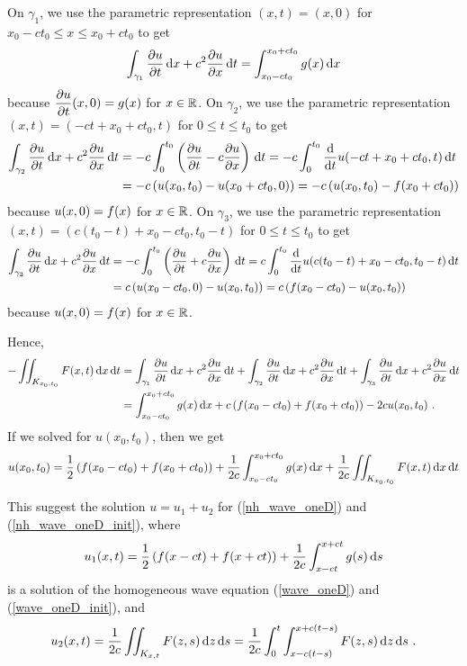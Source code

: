 On $\gamma_1$, we use the parametric representation $(x,t) = (x,0)$ for
$x_0-ct_0 \leq x \leq x_0+ct_0$ to get
\[
\int_{\gamma_1} \pdydx{u}{t} \dx{x} + c^2 \pdydx{u}{x} \dx{t}
= \int_{x_0-ct_0}^{x_0+ct_0} g(x) \dx{x}
\]
because $\DS \pdydx{u}{t}(x,0) = g(x)$ for $x\in \RR$.
On $\gamma_2$, we use the parametric representation
$(x,t) = (-ct+x_0+ct_0,t)$ for $0 \leq t \leq t_0$ to get
\begin{align*}
\int_{\gamma_2} \pdydx{u}{t} \dx{x} + c^2 \pdydx{u}{x} \dx{t}
& = -c \int_0^{t_0} \left( \pdydx{u}{t} - c \pdydx{u}{x} \right) \dx{t}
= -c \int_0^{t_0} \dfdx{u(-ct+x_0+ct_0,t)}{t} \dx{t} \\
& = -c \left( u(x_0,t_0) - u(x_0+ct_0,0) \right)
=  -c \left( u(x_0,t_0) - f(x_0+ct_0) \right)
\end{align*}
because $\DS u(x,0) = f(x)$ for $x \in \RR$.
On $\gamma_3$, we use the parametric representation
$(x,t) = (c(t_0-t)+x_0-ct_0,t_0-t)$ for 
$0 \leq t \leq t_0$ to get
\begin{align*}
\int_{\gamma_3} \pdydx{u}{t} \dx{x} + c^2 \pdydx{u}{x} \dx{t}
& = -c \int_0^{t_0} \left( \pdydx{u}{t} + c \pdydx{u}{x} \right) \dx{t}
= c \int_0^{t_0} \dfdx{u(c(t_0-t)+x_0-ct_0,t_0-t)}{t} \dx{t} \\
& = c \left( u(x_0-ct_0,0) - u(x_0,t_0) \right)
= c \left( f(x_0-ct_0) -u(x_0,t_0) \right)
\end{align*}
because $\DS u(x,0) = f(x)$ for $x \in \RR$.

Hence,
\begin{align*}
-\iint_{K_{x_0,t_0}} F(x,t) \dx{x}\dx{t} &
= \int_{\gamma_1} \pdydx{u}{t} \dx{x} + c^2 \pdydx{u}{x} \dx{t}
+ \int_{\gamma_2} \pdydx{u}{t} \dx{x} + c^2 \pdydx{u}{x} \dx{t}
+ \int_{\gamma_3} \pdydx{u}{t} \dx{x} + c^2 \pdydx{u}{x} \dx{t} \\
&= \int_{x_0-ct_0}^{x_0+ct_0} g(x) \dx{x} 
+ c \left( f(x_0-ct_0) +  f(x_0+ct_0) \right) -2c u(x_0,t_0) \ .
\end{align*}
If we solved for $u(x_0,t_0)$, then we get
\[
u(x_0,t_0) = \frac{1}{2} \left(f(x_0-ct_0) + f(x_0+ct_0)\right)
+ \frac{1}{2c} \int_{x_0-ct_0}^{x_0+ct_0} g(x)\dx{x}
+ \frac{1}{2c} \iint_{K_{x_0,t_0}} F(x,t) \dx{x}\dx{t}
\]

This suggest the solution $u = u_1 + u_2$ for
(\ref{nh_wave_oneD}) and (\ref{nh_wave_oneD_init}), where
\[
u_1(x,t) = \frac{1}{2} \left(f(x-ct) + f(x+ct)\right)
+ \frac{1}{2c} \int_{x-ct}^{x+ct} g(s)\dx{s} 
\]
is a solution of the homogeneous wave equation (\ref{wave_oneD}) and
(\ref{wave_oneD_init}), and
\[
u_2(x,t) = \frac{1}{2c} \iint_{K_{x,t}} F(z,s) \dx{z}\dx{s}
= \frac{1}{2c} \int_0^t \int_{x-c(t-s)}^{x+c(t-s)} F(z,s)\dx{z}\dx{s} \ .
\]

